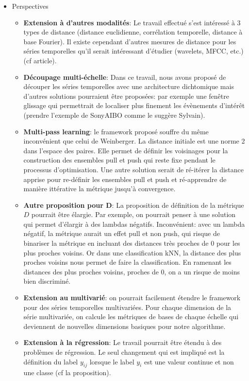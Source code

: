\begin{itemize}
	\item Perspectives
	\begin{itemize}
		\item \textbf{Extension à d'autres modalités}: Le travail effectué s'est intéressé à 3 types de distance (distance euclidienne, corrélation temporelle, distance à base Fourier). Il existe cependant d'autres mesures de distance pour les séries temporelles qu'il serait intéressant d'étudier (wavelets, MFCC, etc.) (cf article).
		\item \textbf{Découpage multi-échelle}: Dans ce travail, nous avons proposé de découper les séries temporelles avec une architecture dichtomique mais d'autres solutions pourraient être proposées: par exemple une fenêtre glissage qui permettrait de localiser plus finement les évènements d'intérêt (prendre l'exemple de SonyAIBO comme le suggère Sylvain).
		\item \textbf{Multi-pass learning}: le framework proposé souffre du même inconvénient que celui de Weinberger. La distance initiale est une norme 2 dans l'espace des paires. Elle permet de définir les voisinages pour la construction des ensembles pull et push qui reste fixe pendant le processus d'optimisation. Une autre solution serait de ré-itérer la distance apprise pour re-définir les ensembles pull et push et ré-apprendre de manière ittérative la métrique jusqu'à convergence.
		\item \textbf{Autre proposition pour D}: La proposition de définition de la métrique $D$ pourrait être élargie. Par exemple, on pourrait penser à une solution qui permet d'élargir à des lambdas négatifs. Inconvénient: avec un lambda négatif, la métrique aurait un effet pull et non push, qui risque de binariser la métrique en incluant des distances très proches de 0 pour les plus proches voisins. Or dans une classification kNN, la distance des plus proches voisins nous permet de faire la classification. En ramenant les distances des plus proches voisins, proches de 0, on a un risque de moins bien discriminé.
		\item \textbf{Extension au multivarié}: on pourrait facilement étendre le framework pour des séries temporelles multivariées. Pour chaque dimension de la série multivariée, on calcule les métriques de bases de chaque échelle qui deviennent de nouvelles dimensions basiques pour notre algorithme.
		\item \textbf{Extension à la régression}: Le travail pourrait être étendu à des problèmes de régression. Le seul changement qui est impliqué est la définition du label $y_{ij}$ lorsque le label $y_i$ est une valeur continue et non une classe (cf la proposition).

\end{itemize}
\end{itemize}
